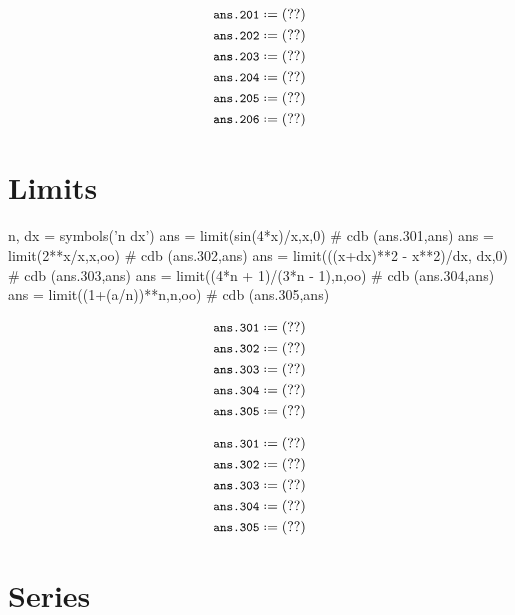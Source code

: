 \documentclass[12pt]{cdblatex}
\begin{document}
\begin{align*}
   &\cdb*{ans.201}\\
   &\cdb*{ans.202}\\
   &\cdb*{ans.203}\\
   &\cdb*{ans.204}\\
   &\cdb*{ans.205}\\
   &\cdb*{ans.206}
\end{align*}

\clearpage

\section*{Limits}

\vspace{-10pt}

\begin{minipage}[t]{0.65\textwidth}
\begin{cadabra}
   n, dx = symbols('n dx')
   ans = limit(sin(4*x)/x,x,0)                  # cdb (ans.301,ans)
   ans = limit(2**x/x,x,oo)                     # cdb (ans.302,ans)
   ans = limit(((x+dx)**2 - x**2)/dx, dx,0)     # cdb (ans.303,ans)
   ans = limit((4*n + 1)/(3*n - 1),n,oo)        # cdb (ans.304,ans)
   ans = limit((1+(a/n))**n,n,oo)               # cdb (ans.305,ans)
\end{cadabra}
\end{minipage}
\hskip 1cm
\begin{minipage}[t]{0.35\textwidth}
\begin{latex}
   \begin{align*}
      &\cdb*{ans.301}\\
      &\cdb*{ans.302}\\
      &\cdb*{ans.303}\\
      &\cdb*{ans.304}\\
      &\cdb*{ans.305}
   \end{align*}
\end{latex}
\end{minipage}

\begin{align*}
   &\cdb*{ans.301}\\
   &\cdb*{ans.302}\\
   &\cdb*{ans.303}\\
   &\cdb*{ans.304}\\
   &\cdb*{ans.305}
\end{align*}

\section*{Series}
\end{document}
